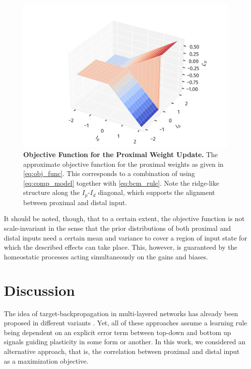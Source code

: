 \documentclass[10pt,a4paper,twocolumn]{article}
\begin{document}
		\begin{figure}
			\includegraphics[width=\columnwidth]{obj_func}
			\caption{{\bf Objective Function for the Proximal Weight Update.} The 
			approximate objective function for the proximal weights as given in
			\eqref{eq:obj_func}. This corresponds to a combination of using 
		\eqref{eq:comp_model} together with \eqref{eq:bcm_rule}. Note the ridge-like
		structure along the $I_p$-$I_d$ diagonal, which supports the alignment between
		proximal and distal input.}
		\label{fig:obj_func}
		\end{figure}
		
		It should be noted, though, that to a certain extent, the objective function is not
		scale-invariant in the sense that the prior distributions of both proximal 
		and distal inputs need a certain mean and variance to cover a region of input
		state for which the described effects can take place. This, however, is 
		guaranteed by the homeostatic processes acting simultaneously on the gains
		and biases.
		
		
		\section{Discussion}
		
		The idea of target-backpropagation in multi-layered networks
		has already been proposed in different variants
		\cite{Bengio2014,Lee2015,Guerguiev2017}. Yet, all of these approaches
		assume a learning rule being dependent on an explicit error term 
		between top-down and bottom up signals guiding plasticity in some form
		or another. In this work, we considered an alternative approach, that is,
		the correlation between proximal and distal input as a maximization
		objective.
		
\end{document}
